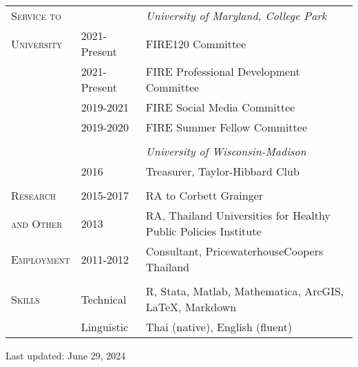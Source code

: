 \documentclass[letterpaper,11pt,oneside]{article}\usepackage[]{graphicx}\usepackage[]{xcolor}
\begin{document}
\noindent \begin{tabular}{p{1.2in} p{0.9in} l}                         
\textsc{Service to}		&               & \textit{University of Maryland, College Park} \\
\textsc{University}	  & 2021-Present  & FIRE120 Committee \\
                      & 2021-Present	& FIRE Professional Development Committee \\
                      & 2019-2021 	  & FIRE Social Media Committee \\
                      & 2019-2020 	  & FIRE Summer Fellow Committee \\
                      & & \\  
                      &               & \textit{University of Wisconsin-Madison} \\
                		  & 2016			    & Treasurer, Taylor-Hibbard Club\\
				              & 				      & \\
                        
\textsc{Research}		& 2015-2017	        & RA to Corbett Grainger\\
\textsc{and Other}	& 2013 				      & RA, Thailand Universities for Healthy Public Policies Institute\\
\textsc{Employment}	& 2011-2012 		    & Consultant, PricewaterhouseCoopers Thailand\\
                    & 				          & \\
\textsc{Skills}	& Technical   & R, Stata, Matlab, Mathematica, ArcGIS, \LaTeX, Markdown \\
        		    & Linguistic & Thai (native), English (fluent) \\
\end{tabular}

\begin{center} Last updated: June 29, 2024 \end{center}
					
\end{document}
